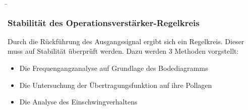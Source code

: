 \begin{frame}
{   %
   } 
	\b{\frametitle{Stabilität des Operationsverstärker-Regelkreis}
    Durch die Rückführung des Ausgangssignal ergibt sich ein Regelkreis. Dieser muss auf Stabilität überprüft werden. Dazu werden 3 Methoden vorgstellt:
    \begin{itemize}
    \item Die Frequengangzanalyse auf Grundlage des Bodediagramms
    \item Die Untersuchung der Übertragungsfunktion auf ihre Pollagen
    \item Die Analyse des Einschwingverhaltens
    \end{itemize}}
\end{frame}

